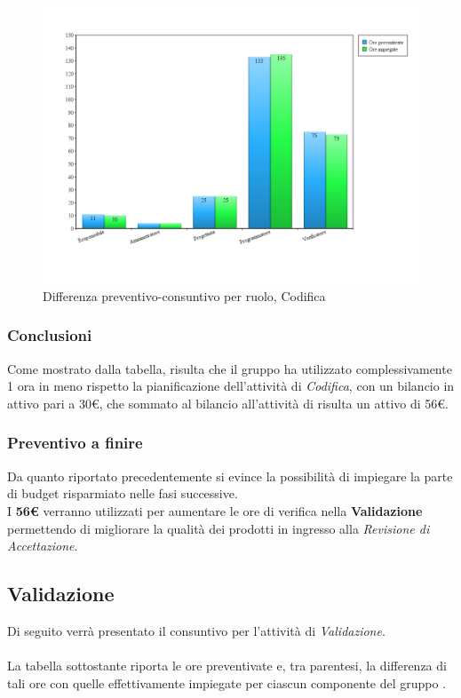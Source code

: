 \begin{figure}[H]
	\centering
	\includegraphics[scale=0.4]{immagini/Grafi/Codifica_oreRuolo.png}
	\caption{Differenza preventivo-consuntivo per ruolo, Codifica}
\end{figure}
\FloatBarrier

\subsubsection{Conclusioni}
Come mostrato dalla tabella, risulta che il gruppo ha utilizzato complessivamente 1 ora in meno rispetto la pianificazione dell'attività di \textit{Codifica}, con un bilancio in attivo pari a 30€, che sommato al bilancio all'attività di \textit{\PD} risulta un attivo di 56€.

\subsubsection{Preventivo a finire}
Da quanto riportato precedentemente si evince la possibilità di impiegare la parte di budget risparmiato nelle fasi successive. \\
I \textbf{56€} verranno utilizzati per aumentare le ore di verifica nella \textbf{Validazione} permettendo di migliorare la qualità dei prodotti in ingresso alla \textit{Revisione di Accettazione}.

\newpage
\subsection{Validazione}
Di seguito verrà presentato il consuntivo per l'attività di \textit{Validazione}.
\\\\
La tabella sottostante riporta le ore preventivate e, tra parentesi, la differenza di tali ore con quelle effettivamente impiegate per ciascun componente del gruppo \gruppo.

